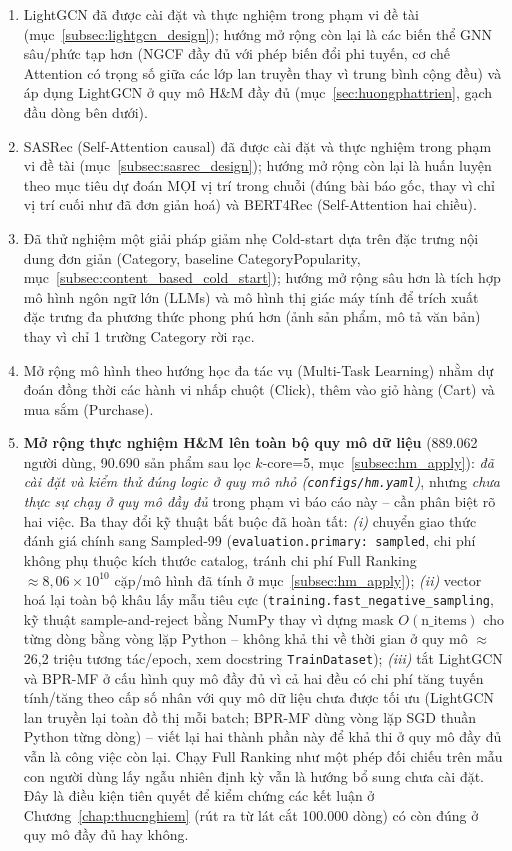 \begin{enumerate}
    \item LightGCN đã được cài đặt và thực nghiệm trong phạm vi đề tài (mục~\ref{subsec:lightgcn_design}); hướng mở rộng còn lại là các biến thể GNN sâu/phức tạp hơn (NGCF đầy đủ với phép biến đổi phi tuyến, cơ chế Attention có trọng số giữa các lớp lan truyền thay vì trung bình cộng đều) và áp dụng LightGCN ở quy mô H\&M đầy đủ (mục~\ref{sec:huongphattrien}, gạch đầu dòng bên dưới).
    \item SASRec (Self-Attention causal) đã được cài đặt và thực nghiệm trong phạm vi đề tài (mục~\ref{subsec:sasrec_design}); hướng mở rộng còn lại là huấn luyện theo mục tiêu dự đoán MỌI vị trí trong chuỗi (đúng bài báo gốc, thay vì chỉ vị trí cuối như đã đơn giản hoá) và BERT4Rec (Self-Attention hai chiều).
    \item Đã thử nghiệm một giải pháp giảm nhẹ Cold-start dựa trên đặc trưng nội dung đơn giản (Category, baseline CategoryPopularity, mục~\ref{subsec:content_based_cold_start}); hướng mở rộng sâu hơn là tích hợp mô hình ngôn ngữ lớn (LLMs) và mô hình thị giác máy tính để trích xuất đặc trưng đa phương thức phong phú hơn (ảnh sản phẩm, mô tả văn bản) thay vì chỉ 1 trường Category rời rạc.
    \item Mở rộng mô hình theo hướng học đa tác vụ (Multi-Task Learning) nhằm dự đoán đồng thời các hành vi nhấp chuột (Click), thêm vào giỏ hàng (Cart) và mua sắm (Purchase).
    \item \textbf{Mở rộng thực nghiệm H\&M lên toàn bộ quy mô dữ liệu} (889.062 người dùng, 90.690 sản phẩm sau lọc $k$-core=5, mục~\ref{subsec:hm_apply}): \emph{đã cài đặt và kiểm thử đúng logic ở quy mô nhỏ (\texttt{configs/hm.yaml})}, nhưng \emph{chưa thực sự chạy ở quy mô đầy đủ} trong phạm vi báo cáo này -- cần phân biệt rõ hai việc. Ba thay đổi kỹ thuật bắt buộc đã hoàn tất: \textit{(i)} chuyển giao thức đánh giá chính sang Sampled-99 (\texttt{evaluation.primary: sampled}, chi phí không phụ thuộc kích thước catalog, tránh chi phí Full Ranking $\approx 8{,}06\times10^{10}$ cặp/mô hình đã tính ở mục~\ref{subsec:hm_apply}); \textit{(ii)} vector hoá lại toàn bộ khâu lấy mẫu tiêu cực (\texttt{training.fast\_negative\_sampling}, kỹ thuật sample-and-reject bằng NumPy thay vì dựng mask $O(\text{n\_items})$ cho từng dòng bằng vòng lặp Python -- không khả thi về thời gian ở quy mô $\approx$26,2 triệu tương tác/epoch, xem docstring \texttt{TrainDataset}); \textit{(iii)} tắt LightGCN và BPR-MF ở cấu hình quy mô đầy đủ vì cả hai đều có chi phí tăng tuyến tính/tăng theo cấp số nhân với quy mô dữ liệu chưa được tối ưu (LightGCN lan truyền lại toàn đồ thị mỗi batch; BPR-MF dùng vòng lặp SGD thuần Python từng dòng) -- viết lại hai thành phần này để khả thi ở quy mô đầy đủ vẫn là công việc còn lại. Chạy Full Ranking như một phép đối chiếu trên mẫu con người dùng lấy ngẫu nhiên định kỳ vẫn là hướng bổ sung chưa cài đặt. Đây là điều kiện tiên quyết để kiểm chứng các kết luận ở Chương~\ref{chap:thucnghiem} (rút ra từ lát cắt 100.000 dòng) có còn đúng ở quy mô đầy đủ hay không.

\end{enumerate}
